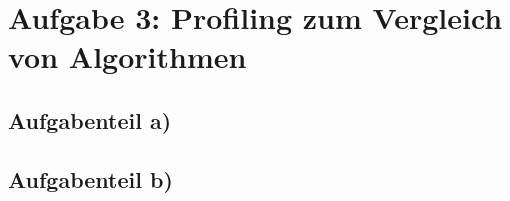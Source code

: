\section*{Aufgabe 3: Profiling zum Vergleich von Algorithmen}

\subsection*{Aufgabenteil a)}

\subsection*{Aufgabenteil b)}
